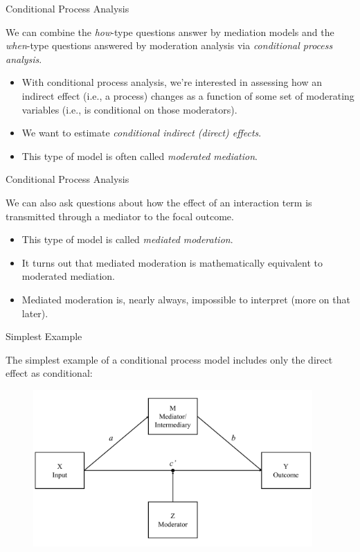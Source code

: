 \documentclass{beamer}
\newcommand{\va}[0]{\vspace{12pt}}
\newcommand{\vb}[0]{\vspace{6pt}}
\begin{document}
\begin{frame}{Conditional Process Analysis}
  
  We can combine the \emph{how}-type questions answer by mediation
  models and the \emph{when}-type questions answered by moderation
  analysis via \emph{conditional process analysis}.
  \va
  \begin{itemize}
    \item With conditional process analysis, we're interested in
      assessing how an indirect effect (i.e., a process) changes as a
      function of some set of moderating variables (i.e., is
      conditional on those moderators).
      \vb
    \item We want to estimate \emph{conditional indirect (direct)
      effects}.  
      \vb
    \item This type of model is often called \emph{moderated
      mediation}.
  \end{itemize}
  
\end{frame}


\begin{frame}{Conditional Process Analysis}
  
  We can also ask questions about how the effect of an interaction
  term is transmitted through a mediator to the focal outcome.
  \va
  \begin{itemize}
    \item This type of model is called \emph{mediated moderation}.
      \vb
    \item It turns out that mediated moderation is mathematically
      equivalent to moderated mediation.
      \vb
    \item Mediated moderation is, nearly always, impossible to
      interpret (more on that later).
  \end{itemize}
  
\end{frame}



\begin{frame}{Simplest Example}
  
  The simplest example of a conditional process model includes only
  the direct effect as conditional:
  \vb
  \begin{figure}
    \includegraphics[width=0.95\textwidth]{figures/modCwithZConceptual.pdf}
  \end{figure}
  
\end{frame}
\end{document}
